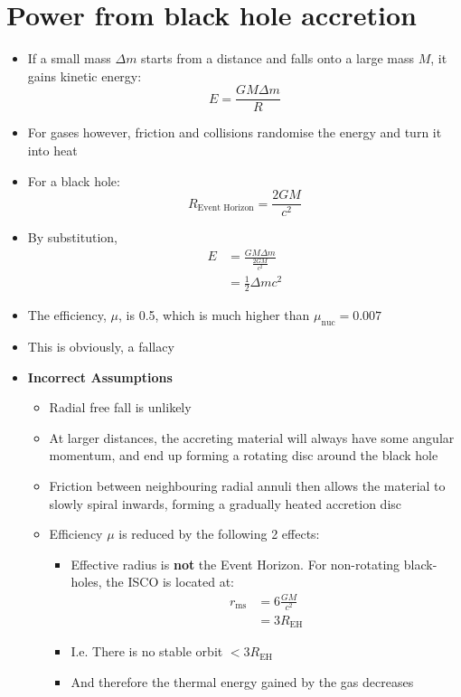 \documentclass{article}
\begin{document}
\section{Power from black hole accretion}
\begin{itemize}
\item If a small mass $\Delta m$ starts from a distance and falls onto a large mass $M$, it gains kinetic energy:
\begin{equation}
E=\frac{GM \Delta m}{R}
\end{equation}
\item For gases however, friction and collisions randomise the energy and turn it into heat
\item For a black hole:
\begin{equation}
R_\text{Event Horizon}=\frac{2GM}{c^2}
\end{equation}
\item By substitution,
\begin{align}
E&=\frac{GM \Delta m}{\frac{2GM}{c^2}}\\
&=\frac{1}{2}\Delta m c^2
\end{align}
\item The efficiency, $\mu$, is 0.5, which is much higher than $\mu_\text{nuc}=0.007$
\item This is obviously, a fallacy
\item \textbf{Incorrect Assumptions}
\begin{itemize}
\item Radial free fall is unlikely
\item At larger distances, the
accreting material will always have some angular momentum, and end up forming a rotating disc around the black hole
\item Friction between neighbouring radial annuli then allows
the material to slowly spiral inwards, forming a gradually heated accretion disc
\item Efficiency $\mu$ is reduced by the following 2 effects:
\begin{itemize}
\item Effective radius is \textbf{not} the Event Horizon. For non-rotating black-holes, the ISCO is located at:
\begin{align}
r_\text{ms}&=6\frac{GM}{c^2}\\
&=3R_\text{EH}
\end{align}
\item I.e. There is no stable orbit $<3R_\text{EH}$
\item And therefore the thermal energy gained by the gas decreases

\end{itemize}
\end{itemize}
\end{itemize}
\end{document}
